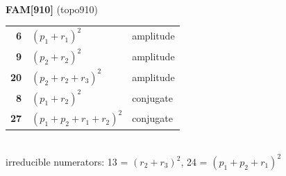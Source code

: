 \documentclass[10pt]{article}
\begin{document}
\begin{minipage}[t]{0.48\textwidth}
{}\\[2mm]\textbf{FAM[910]} (topo910)\\[2pt]{\footnotesize\begin{tabular}{@{}r@{\ \ }l@{\ \ }l@{}}\textbf{6} & $(p_1+r_1)^2$ & amplitude\\
\textbf{9} & $(p_2+r_2)^2$ & amplitude\\
\textbf{20} & $(p_2+r_2+r_3)^2$ & amplitude\\
\textbf{8} & $(p_1+r_2)^2$ & conjugate\\
\textbf{27} & $(p_1+p_2+r_1+r_2)^2$ & conjugate\\\end{tabular}}\\[2pt]{\scriptsize irreducible numerators: 13 = $(r_2+r_3)^2$, 24 = $(p_1+p_2+r_1)^2$}\end{minipage}\hfill%
\end{document}
